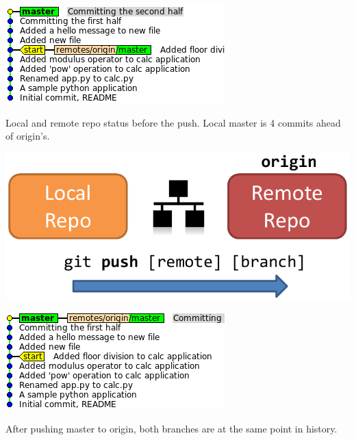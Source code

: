 \documentclass{../common/tufte-latex/tufte-handout}
\begin{document}
\begin{marginfigure}%
  \centering
  \includegraphics[width=\linewidth]{gitcommit-pre-push.png}
  \label{fig:gitcommit-pre-push}
  \caption{Local and remote repo status before the push. Local master is 4 commits ahead of origin's.}
\end{marginfigure}
\begin{marginfigure}%
  \centering
  \includegraphics[width=\linewidth]{gitpush-schema.pdf}
  \label{fig:gitpush-schema}
\end{marginfigure}
\begin{marginfigure}%
  \centering
  \includegraphics[width=\linewidth]{gitcommit-post-push.png}
  \label{fig:gitcommit-post-push}
  \caption{After pushing master to origin, both branches are at the same point in history.}
\end{marginfigure}
\end{document}
